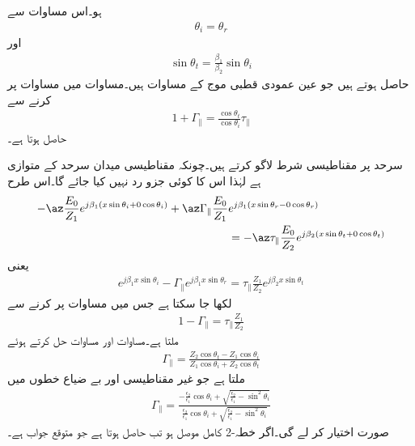 ہو۔اس مساوات سے
\begin{align}
\theta_i=\theta_r
\end{align}
اور
\begin{align}
\sin \theta_t =\frac{\beta_1}{\beta_2} \sin \theta_i
\end{align}
حاصل ہوتے ہیں جو عین عمودی قطبی موج کے مساوات ہیں۔مساوات  میں مساوات  پر کرنے سے
\begin{align}\label{مساوات_ترچھی_متوازی_انعکاسی_انحرافی_تعلق_الف}
1   +  \Gamma_{\parallel} =\frac{\cos \theta_t}{\cos \theta_i} \tau_{\parallel} 
\end{align}
حاصل ہوتا ہے۔

سرحد پر مقناطیسی شرط لاگو کرتے ہیں۔چونکہ مقناطیسی میدان سرحد کے متوازی ہے لہٰذا اس کا کوئی جزو رد نہیں کیا جائے گا۔اس طرح
\begin{align*}
-\az \frac{E_0}{Z_1} e^{j\beta_1 (x\sin \theta_i +0 \cos \theta_i)}+\az \Gamma_{\parallel} \frac{ E_0}{Z_1} &e^{j \beta_1 (x \sin \theta_r-0\cos \theta_r)}\\
&=-\az \tau_{\parallel} \frac{E_0}{Z_2} e^{j \beta_2 (x \sin \theta_t+0\cos \theta_t)} 
\end{align*}
یعنی
\begin{align*}
 e^{j\beta_1 x\sin \theta_i}-\Gamma_{\parallel}  e^{j \beta_1 x \sin \theta_r}= \tau_{\parallel} \frac{Z_1}{Z_2} e^{j \beta_2 x \sin \theta_t} 
\end{align*}
لکھا جا سکتا ہے جس میں مساوات  پر کرنے سے
\begin{align}\label{مساوات_ترچھی_متوازی_انعکاسی_انحرافی_تعلق_ب}
1-\Gamma_{\parallel} = \tau_{\parallel} \frac{Z_1}{Z_2} 
\end{align}
ملتا ہے۔مساوات  اور مساوات  حل کرتے ہوئے
\begin{align}\label{مساوات_ترچھی_شرح_انعکاس_متوازی_موج_الف}
\Gamma_{\parallel} =\frac{Z_2 \cos \theta_t -Z_1 \cos \theta_i}{Z_1 \cos \theta_i+Z_2 \cos \theta_t}
\end{align}
ملتا ہے جو غیر مقناطیسی اور بے ضیاع خطوں میں
\begin{align}\label{مساوات_ترچھی_شرح_انعکاس_بلمقابل_زاویہ_آمد}
\Gamma_{\parallel} =\frac{-\frac{\epsilon_2}{\epsilon_1}\cos \theta_i+\sqrt{\frac{\epsilon_2}{\epsilon_1}-\sin^2 \theta_i}}{\frac{\epsilon_2}{\epsilon_1}\cos \theta_i+\sqrt{\frac{\epsilon_2}{\epsilon_1}-\sin^2 \theta_i}}
\end{align}
صورت اختیار کر لے گی۔اگر خطہ-2 کامل موصل ہو تب  حاصل ہوتا ہے جو متوقع جواب ہے۔ 

